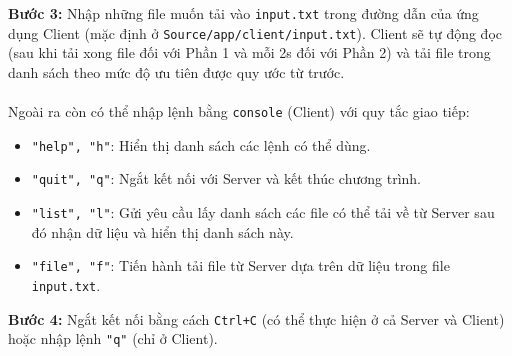 \documentclass[a4paper,12pt]{report}
\begin{document}
\begin{description}
  \item \textbf{Bước 3:} Nhập những file muốn tải vào \verb|input.txt| trong đường dẫn của ứng dụng Client (mặc định ở \verb|Source/app/client/input.txt|). Client sẽ tự động đọc (sau khi tải xong file đối với Phần 1 và mỗi 2s đối với Phần 2) và tải file trong danh sách theo mức độ ưu tiên được quy ước từ trước.\\ \\
        Ngoài ra còn có thể nhập lệnh bằng \verb|console| (Client) với quy tắc giao tiếp:
        \begin{itemize}
          \item \verb|"help", "h"|: Hiển thị danh sách các lệnh có thể dùng.
          \item \verb|"quit", "q"|: Ngắt kết nối với Server và kết thúc chương trình.
          \item \verb|"list", "l"|: Gửi yêu cầu lấy danh sách các file có thể tải về từ Server sau đó nhận dữ liệu và hiển thị danh sách này.
          \item \verb|"file", "f"|: Tiến hành tải file từ Server dựa trên dữ liệu trong file \verb|input.txt|.
        \end{itemize}
  \item \textbf{Bước 4:} Ngắt kết nối bằng cách \verb|Ctrl+C| (có thể thực hiện ở cả Server và Client) hoặc nhập lệnh \verb|"q"| (chỉ ở Client).
\end{description}

\end{document}
